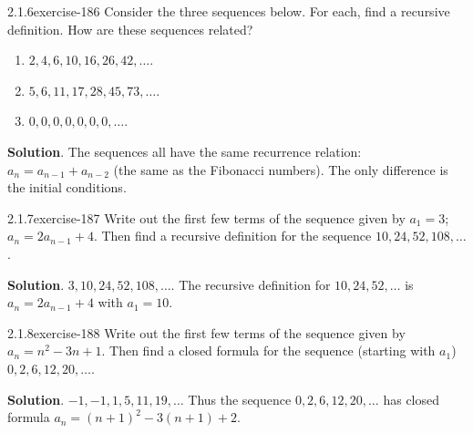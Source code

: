 \documentclass[twoside,11pt,]{book}
\numberwithin{equation}{chapter}
\begin{document}
\begin{divisionsolution}{2.1.6}{}{exercise-186}%
\hypertarget{p-3025}{}%
Consider the three sequences below. For each, find a recursive definition. How are these sequences related?\leavevmode%
\begin{enumerate}[label=(\alph*)]
\item\hypertarget{li-1778}{}\(2, 4, 6, 10, 16, 26, 42, \ldots\).%
\item\hypertarget{li-1779}{}\(5, 6, 11, 17, 28, 45, 73, \ldots\).%
\item\hypertarget{li-1780}{}\(0, 0 , 0 , 0 , 0 , 0 , 0 ,\ldots\).%
\end{enumerate}
%
\par\smallskip%
\noindent\textbf{Solution}.\quad%
\hypertarget{p-3026}{}%
The sequences all have the same recurrence relation: \(a_n = a_{n-1} + a_{n-2}\) (the same as the Fibonacci numbers). The only difference is the initial conditions.%
\end{divisionsolution}%
\begin{divisionsolution}{2.1.7}{}{exercise-187}%
\hypertarget{p-3027}{}%
Write out the first few terms of the sequence given by \(a_1 = 3\); \(a_n = 2a_{n-1} + 4\). Then find a recursive definition for the sequence \(10, 24, 52, 108, \ldots\).%
\par\smallskip%
\noindent\textbf{Solution}.\quad%
\hypertarget{p-3028}{}%
\(3, 10, 24, 52, 108,\ldots\). The recursive definition for \(10, 24, 52, \ldots\) is \(a_n = 2a_{n-1} + 4\) with \(a_1 = 10\).%
\end{divisionsolution}%
\begin{divisionsolution}{2.1.8}{}{exercise-188}%
\hypertarget{p-3029}{}%
Write out the first few terms of the sequence given by \(a_n = n^2 - 3n + 1\). Then find a closed formula for the sequence (starting with \(a_1\)) \(0, 2, 6, 12, 20, \ldots\).%
\par\smallskip%
\noindent\textbf{Solution}.\quad%
\hypertarget{p-3030}{}%
\(-1, -1, 1, 5, 11, 19,\ldots\) Thus the sequence \(0, 2, 6, 12, 20,\ldots\) has closed formula \(a_n = (n+1)^2 - 3(n+1) + 2\).%
\end{divisionsolution}%
\end{document}
